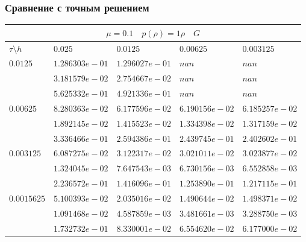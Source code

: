 \documentclass[a4paper,12pt]{extarticle}
\begin{document}
\subsubsection{Сравнение с точным решением}
\begin{tabular}{|l|l|l|l|l|}
	\hline
	\multicolumn{5}{|c|}{$\mu =0.1 \quad  p(\rho) =1 \rho \quad G$}\\
	\hline
	$\tau\setminus h$ & $0.025$ & $0.0125$ & $0.00625$ & $0.003125$\\
	\hline
	$0.0125$  & $1.286303e-01$ & $1.296027e-01$ & $nan$ & $nan$\\
	& $3.181579e-02$ & $2.754667e-02$ & $nan$ & $nan$\\
	& $5.625332e-01$ & $4.921336e-01$ & $nan$ & $nan$\\
	\hline
	$0.00625$  & $8.280363e-02$ & $6.177596e-02$ & $6.190156e-02$ & $6.185257e-02$\\
	& $1.892145e-02$ & $1.415523e-02$ & $1.334398e-02$ & $1.317159e-02$\\
	& $3.336466e-01$ & $2.594386e-01$ & $2.439745e-01$ & $2.402602e-01$\\
	\hline
	$0.003125$  & $6.087275e-02$ & $3.122317e-02$ & $3.021011e-02$ & $3.023877e-02$\\
	& $1.324045e-02$ & $7.647543e-03$ & $6.730156e-03$ & $6.552858e-03$\\
	& $2.236572e-01$ & $1.416096e-01$ & $1.253890e-01$ & $1.217115e-01$\\
	\hline
	$0.0015625$  & $5.100393e-02$ & $2.035016e-02$ & $1.490644e-02$ & $1.498371e-02$\\
	& $1.091468e-02$ & $4.587859e-03$ & $3.481661e-03$ & $3.288750e-03$\\
	& $1.732732e-01$ & $8.330001e-02$ & $6.554620e-02$ & $6.177000e-02$\\
	\hline
\end{tabular}
\end{document}
